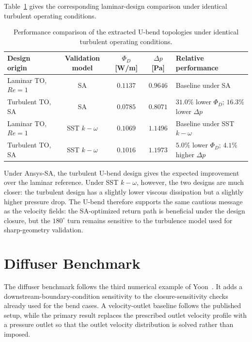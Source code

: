Table~\ref{tab:alexandersen_ubend_laminar_perf} gives the corresponding laminar-design comparison under identical turbulent operating conditions.

\begin{table}[!ht]
	\centering
	\footnotesize
	\caption{Performance comparison of the extracted U-bend topologies under identical turbulent operating conditions.}
	\label{tab:alexandersen_ubend_laminar_perf}
	\renewcommand{\arraystretch}{1.2}
	\begin{tabularx}{\textwidth}{X c c c X}
		\hline
		\textbf{Design origin} & \textbf{Validation model} & \textbf{$\Phi_D$ [W/m]} & \textbf{$\Delta p$ [Pa]} & \textbf{Relative performance} \\
		\hline
		Laminar TO, $Re=1$ & SA & $0.1137$ & $0.9646$ & Baseline under SA \\
		Turbulent TO, SA & SA & $0.0785$ & $0.8071$ & $31.0\%$ lower $\Phi_D$; $16.3\%$ lower $\Delta p$ \\
		Laminar TO, $Re=1$ & SST $k-\omega$ & $0.1069$ & $1.1496$ & Baseline under SST $k-\omega$ \\
		Turbulent TO, SA & SST $k-\omega$ & $0.1016$ & $1.1973$ & $5.0\%$ lower $\Phi_D$; $4.1\%$ higher $\Delta p$ \\
		\hline
	\end{tabularx}
\end{table}

Under Ansys-SA, the turbulent U-bend design gives the expected improvement over the laminar reference. Under SST $k-\omega$, however, the two designs are much closer: the turbulent design has a slightly lower viscous dissipation but a slightly higher pressure drop. The U-bend therefore supports the same cautious message as the velocity fields: the SA-optimized return path is beneficial under the design closure, but the $180^\circ$ turn remains sensitive to the turbulence model used for sharp-geometry validation.

\section{Diffuser Benchmark}
\label{sec:yoon_diffuser}
The diffuser benchmark follows the third numerical example of Yoon~\cite{Yoon2016}. It adds a downstream-boundary-condition sensitivity to the closure-sensitivity checks already used for the bend cases. A velocity-outlet baseline follows the published setup, while the primary result replaces the prescribed outlet velocity profile with a pressure outlet so that the outlet velocity distribution is solved rather than imposed.

